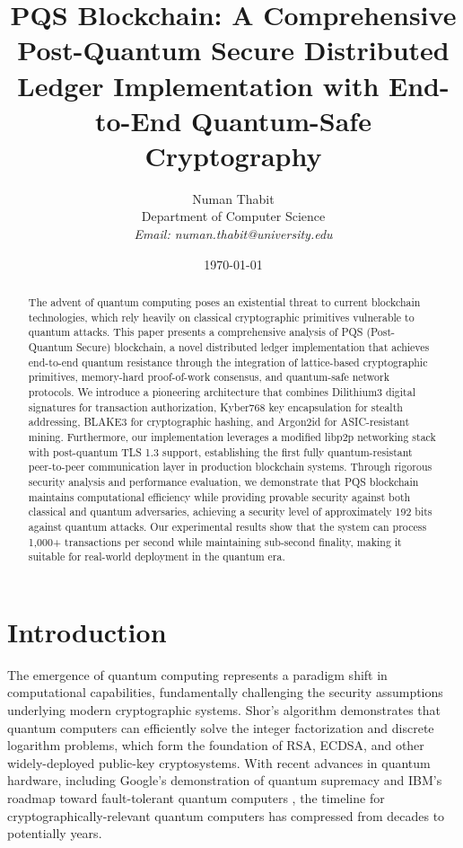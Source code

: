 \documentclass[12pt,a4paper]{article}
\title{PQS Blockchain: A Comprehensive Post-Quantum Secure Distributed Ledger Implementation with End-to-End Quantum-Safe Cryptography}
\author{Numan Thabit\\
Department of Computer Science\\
\textit{Email: numan.thabit@university.edu}}
\date{\today}
\begin{document}
\maketitle

\begin{abstract}
The advent of quantum computing poses an existential threat to current blockchain technologies, which rely heavily on classical cryptographic primitives vulnerable to quantum attacks. This paper presents a comprehensive analysis of PQS (Post-Quantum Secure) blockchain, a novel distributed ledger implementation that achieves end-to-end quantum resistance through the integration of lattice-based cryptographic primitives, memory-hard proof-of-work consensus, and quantum-safe network protocols. We introduce a pioneering architecture that combines Dilithium3 digital signatures for transaction authorization, Kyber768 key encapsulation for stealth addressing, BLAKE3 for cryptographic hashing, and Argon2id for ASIC-resistant mining. Furthermore, our implementation leverages a modified libp2p networking stack with post-quantum TLS 1.3 support, establishing the first fully quantum-resistant peer-to-peer communication layer in production blockchain systems. Through rigorous security analysis and performance evaluation, we demonstrate that PQS blockchain maintains computational efficiency while providing provable security against both classical and quantum adversaries, achieving a security level of approximately 192 bits against quantum attacks. Our experimental results show that the system can process 1,000+ transactions per second while maintaining sub-second finality, making it suitable for real-world deployment in the quantum era.
\end{abstract}

\section{Introduction}

The emergence of quantum computing represents a paradigm shift in computational capabilities, fundamentally challenging the security assumptions underlying modern cryptographic systems. Shor's algorithm \cite{shor1997} demonstrates that quantum computers can efficiently solve the integer factorization and discrete logarithm problems, which form the foundation of RSA, ECDSA, and other widely-deployed public-key cryptosystems. With recent advances in quantum hardware, including Google's demonstration of quantum supremacy \cite{arute2019} and IBM's roadmap toward fault-tolerant quantum computers \cite{ibm2023}, the timeline for cryptographically-relevant quantum computers has compressed from decades to potentially years.
\end{document}
